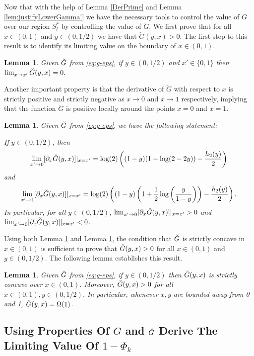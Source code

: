 \documentclass[12pt,reqno]{amsart}
\numberwithin{equation}{section}
\newtheorem{lemma}[theorem]{Lemma}
\theoremstyle{definition}
\newcommand{\conv}[1]{\overset{#1}{\rightarrow}}
\renewcommand{\[}{\begin{equation}}
\renewcommand{\]}{\end{equation}}
\renewcommand{\|}{\bigg{|}}
\begin{document}
Now that with the help of Lemma \ref{DerPrime} and Lemma \ref{lem:justifyLowerGamma'} we have the necessary tools to control the value of $G$ over our region $S^*_l$ by controlling the value of $\breve{G}$. We first prove that for all $x \in (0,1)$ and $y \in (0,1/2)$ we have that $\breve{G}(y, x) > 0$. The first step to this result is to identify its limiting value on the boundary of $x \in (0,1)$.
\begin{lemma}\label{zerobound}
    Given $\Breve{G}$ from \eqref{eq:g-eps}, if $y \in (0,1/2)$ and $x' \in \{0,1\}$ then $\lim_{x \conv{} x'}\Breve{G}(y, x) = 0.$
\end{lemma}
Another important property is that the derivative of $\breve{G}$ with respect to $x$ is strictly positive and strictly negative as $x \conv{} 0$ and $x \conv{} 1$ respectively, implying that the function $\breve{G}$ is positive locally around the points $x = 0$ and $x = 1$.
\begin{lemma}\label{posder}
Given $\Breve{G}$ from \eqref{eq:g-eps}, we have the following statement:

If $y \in (0, 1/2)$, then
\[\lim_{x' \conv{} 0}[\partial_{x}\Breve{G}(y, x)]{|}_{x = x'} = \log(2)\left((1-y)(1-\log(2-2y)) - \frac{h_2(y)}{2}\right)\] 
and
\[\lim_{x' \conv{} 1}[\partial_{x}\Breve{G}(y, x)]{|}_{x = x'} = \log(2)\left((1-y)\left(1+\frac{1}{2}\log\left(\frac{y}{1-y} \right)\right) - \frac{h_2(y)}{2}\right).\]
In particular, for all $y \in (0,1/2)$, $\lim_{x' \conv{} 0}[\partial_{x}\Breve{G}(y, x)]|_{x = x'} > 0$ and $\lim_{x' \conv{} 0}[\partial_{x}\Breve{G}(y, x)]|_{x = x'} < 0$.
\end{lemma}


Using both Lemma \ref{zerobound} and Lemma \ref{posder}, the condition that $\Breve{G}$ is strictly concave in $x \in (0,1)$ is sufficient to prove that $\Breve{G}(y, x) > 0$ for all $x \in (0,1)$ and $y \in (0,1/2)$. The following lemma establishes this result.

\begin{lemma}\label{positive}
Given $\Breve{G}$ from \eqref{eq:g-eps}, if $y \in (0,1/2)$ then $\Breve{G}(y,x)$ is strictly concave over $x \in (0,1)$. Moreover, $\Breve{G}(y,x) > 0$ for all $x \in (0,1), y \in (0,1/2)$. In particular, whenever $x,y$ are bounded away from 0 and 1, $\Breve{G}(y,x)=\Omega(1)$.
\end{lemma} 

\subsection{Using Properties Of $G$ and $\Breve{G}$ Derive The Limiting Value Of $1-\Phi_k$}\label{subsec:PhikLimitingValue}
\end{document}
